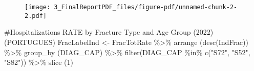 \documentclass[
  letterpaper,
  DIV=11,
  numbers=noendperiod]{scrartcl}
\newenvironment{Shaded}{\begin{snugshade}}{\end{snugshade}}
\newcommand{\CommentTok}[1]{\textcolor[rgb]{0.37,0.37,0.37}{#1}}
\newcommand{\DecValTok}[1]{\textcolor[rgb]{0.68,0.00,0.00}{#1}}
\newcommand{\FunctionTok}[1]{\textcolor[rgb]{0.28,0.35,0.67}{#1}}
\newcommand{\NormalTok}[1]{\textcolor[rgb]{0.00,0.23,0.31}{#1}}
\newcommand{\OtherTok}[1]{\textcolor[rgb]{0.00,0.23,0.31}{#1}}
\newcommand{\SpecialCharTok}[1]{\textcolor[rgb]{0.37,0.37,0.37}{#1}}
\newcommand{\StringTok}[1]{\textcolor[rgb]{0.13,0.47,0.30}{#1}}
\begin{document}
\begin{figure}[H]

{\centering \texttt{[image: 3\_FinalReportPDF\_files/figure-pdf/unnamed-chunk-2-2.pdf]}

}

\end{figure}

\begin{Shaded}
\begin{Highlighting}[]
\CommentTok{\#Hospitalizations RATE by Fracture Type and Age Group (2022) (PORTUGUES)}
\NormalTok{FracLabelInd }\OtherTok{\textless{}{-}}\NormalTok{ FracTotRate }\SpecialCharTok{\%\textgreater{}\%} \FunctionTok{arrange}\NormalTok{ (}\FunctionTok{desc}\NormalTok{(IndFrac)) }\SpecialCharTok{\%\textgreater{}\%} \FunctionTok{group\_by}\NormalTok{ (DIAG\_CAP) }\SpecialCharTok{\%\textgreater{}\%} \FunctionTok{filter}\NormalTok{(DIAG\_CAP }\SpecialCharTok{\%in\%} \FunctionTok{c}\NormalTok{(}\StringTok{"S72"}\NormalTok{, }\StringTok{"S52"}\NormalTok{, }\StringTok{"S82"}\NormalTok{)) }\SpecialCharTok{\%\textgreater{}\%} \FunctionTok{slice}\NormalTok{ (}\DecValTok{1}\NormalTok{) }


\end{Highlighting}
\end{Shaded}
\end{document}
